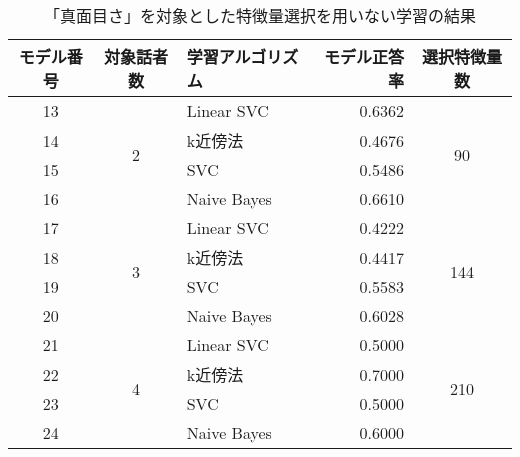 \begin{table}[tpb]
    \caption{「真面目さ」を対象とした特徴量選択を用いない学習の結果}
    \centering
    \begin{tabular}{|c|c|l|r|c|}
        \hline
        モデル番号 & 対象話者数 & 学習アルゴリズム & モデル正答率 & 選択特徴量数 \\\hline\hline
        13 & \multirow{4}{*}{2} & Linear SVC & 0.6362 & \multirow{4}{*}{90} \\ \cline{1-1}\cline{3-4}
        14 & & k近傍法 & 0.4676 & \\ \cline{1-1}\cline{3-4}
        15 & & SVC & 0.5486 & \\ \cline{1-1}\cline{3-4}
        16 & & Naive Bayes & 0.6610 & \\ \hline
        17 & \multirow{4}{*}{3} & Linear SVC & 0.4222 & \multirow{4}{*}{144} \\ \cline{1-1}\cline{3-4}
        18 & & k近傍法 & 0.4417 & \\ \cline{1-1}\cline{3-4}
        19 & & SVC & 0.5583 & \\ \cline{1-1}\cline{3-4}
        20 & & Naive Bayes & 0.6028 & \\ \hline
        21 & \multirow{4}{*}{4} & Linear SVC & 0.5000 & \multirow{4}{*}{210} \\ \cline{1-1}\cline{3-4}
        22 & & k近傍法 & 0.7000 & \\ \cline{1-1}\cline{3-4}
        23 & & SVC & 0.5000 & \\ \cline{1-1}\cline{3-4}
        24 & & Naive Bayes & 0.6000 & \\ \hline
    \end{tabular}
    \label{tab:seriousness_learning_result_without_FS}
\end{table}

